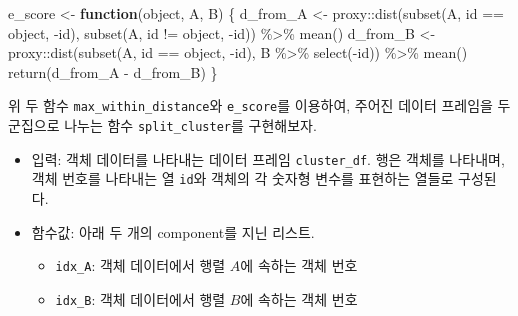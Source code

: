 \documentclass[
]{book}
\newenvironment{Shaded}{\begin{snugshade}}{\end{snugshade}}
\newcommand{\ControlFlowTok}[1]{\textcolor[rgb]{0.13,0.29,0.53}{\textbf{#1}}}
\newcommand{\FunctionTok}[1]{\textcolor[rgb]{0.00,0.00,0.00}{#1}}
\newcommand{\NormalTok}[1]{#1}
\newcommand{\OtherTok}[1]{\textcolor[rgb]{0.56,0.35,0.01}{#1}}
\newcommand{\SpecialCharTok}[1]{\textcolor[rgb]{0.00,0.00,0.00}{#1}}
\providecommand{\tightlist}{%
  \setlength{\itemsep}{0pt}\setlength{\parskip}{0pt}}
\begin{document}
\begin{Shaded}
\begin{Highlighting}[]
\NormalTok{e\_score }\OtherTok{\textless{}{-}} \ControlFlowTok{function}\NormalTok{(object, A, B) \{}
\NormalTok{  d\_from\_A }\OtherTok{\textless{}{-}}\NormalTok{ proxy}\SpecialCharTok{::}\FunctionTok{dist}\NormalTok{(}\FunctionTok{subset}\NormalTok{(A, id }\SpecialCharTok{==}\NormalTok{ object, }\SpecialCharTok{{-}}\NormalTok{id), }
                          \FunctionTok{subset}\NormalTok{(A, id }\SpecialCharTok{!=}\NormalTok{ object, }\SpecialCharTok{{-}}\NormalTok{id)) }\SpecialCharTok{\%\textgreater{}\%} 
    \FunctionTok{mean}\NormalTok{()}
\NormalTok{  d\_from\_B }\OtherTok{\textless{}{-}}\NormalTok{ proxy}\SpecialCharTok{::}\FunctionTok{dist}\NormalTok{(}\FunctionTok{subset}\NormalTok{(A, id }\SpecialCharTok{==}\NormalTok{ object, }\SpecialCharTok{{-}}\NormalTok{id), }
\NormalTok{                          B }\SpecialCharTok{\%\textgreater{}\%} \FunctionTok{select}\NormalTok{(}\SpecialCharTok{{-}}\NormalTok{id)) }\SpecialCharTok{\%\textgreater{}\%} 
    \FunctionTok{mean}\NormalTok{()}
  \FunctionTok{return}\NormalTok{(d\_from\_A }\SpecialCharTok{{-}}\NormalTok{ d\_from\_B)}
\NormalTok{\}}
\end{Highlighting}
\end{Shaded}

위 두 함수 \texttt{max\_within\_distance}와 \texttt{e\_score}를 이용하여, 주어진 데이터 프레임을 두 군집으로 나누는 함수 \texttt{split\_cluster}를 구현해보자.

\begin{itemize}
\tightlist
\item
  입력: 객체 데이터를 나타내는 데이터 프레임 \texttt{cluster\_df}. 행은 객체를 나타내며, 객체 번호를 나타내는 열 \texttt{id}와 객체의 각 숫자형 변수를 표현하는 열들로 구성된다.
\item
  함수값: 아래 두 개의 component를 지닌 리스트.

  \begin{itemize}
  \tightlist
  \item
    \texttt{idx\_A}: 객체 데이터에서 행렬 \(A\)에 속하는 객체 번호
  \item
    \texttt{idx\_B}: 객체 데이터에서 행렬 \(B\)에 속하는 객체 번호
  \end{itemize}
\end{itemize}
\end{document}
